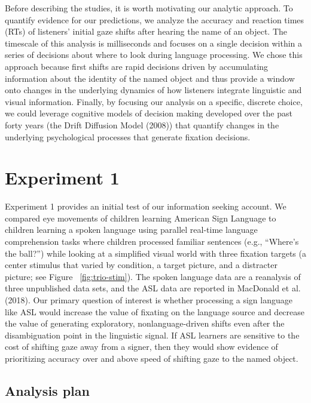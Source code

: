\documentclass[english,floatsintext,man]{apa6}
\begin{document}
Before describing the studies, it is worth motivating our analytic
approach. To quantify evidence for our predictions, we analyze the
accuracy and reaction times (RTs) of listeners' initial gaze shifts
after hearing the name of an object. The timescale of this analysis is
milliseconds and focuses on a single decision within a series of
decisions about where to look during language processing. We chose this
approach because first shifts are rapid decisions driven by accumulating
information about the identity of the named object and thus provide a
window onto changes in the underlying dynamics of how listeners
integrate linguistic and visual information. Finally, by focusing our
analysis on a specific, discrete choice, we could leverage cognitive
models of decision making developed over the past forty years (the Drift
Diffusion Model (2008)) that quantify changes in the underlying
psychological processes that generate fixation decisions.

\hypertarget{experiment-1}{%
\section{Experiment 1}\label{experiment-1}}

Experiment 1 provides an initial test of our information seeking
account. We compared eye movements of children learning American Sign
Language to children learning a spoken language using parallel real-time
language comprehension tasks where children processed familiar sentences
(e.g., \enquote{Where's the ball?}) while looking at a simplified visual
world with three fixation targets (a center stimulus that varied by
condition, a target picture, and a distracter picture; see Figure
~\ref{fig:trio-stim}). The spoken language data are a reanalysis of
three unpublished data sets, and the ASL data are reported in MacDonald
et al. (2018). Our primary question of interest is whether processing a
sign language like ASL would increase the value of fixating on the
language source and decrease the value of generating exploratory,
nonlanguage-driven shifts even after the disambiguation point in the
linguistic signal. If ASL learners are sensitive to the cost of shifting
gaze away from a signer, then they would show evidence of prioritizing
accuracy over and above speed of shifting gaze to the named object.

\hypertarget{analysis-plan}{%
\subsection{Analysis plan}\label{analysis-plan}}
\end{document}
